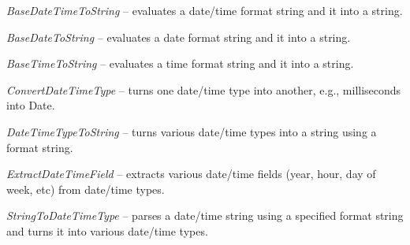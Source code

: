 \begin{tight_itemize}
	\item \textit{BaseDateTimeToString} -- evaluates a date/time format string 
	and it into a string.
	\item \textit{BaseDateToString} -- evaluates a date format string 
	and it into a string.
	\item \textit{BaseTimeToString} -- evaluates a time format string 
	and it into a string.
	\item \textit{ConvertDateTimeType} -- turns one date/time type into another,
	e.g., milliseconds into Date.
	\item \textit{DateTimeTypeToString} -- turns various date/time types into a 
	string using a format string.
	\item \textit{ExtractDateTimeField} -- extracts various date/time fields 
	(year, hour, day of week, etc) from date/time types.
	\item \textit{StringToDateTimeType} -- parses a date/time string using a 
	specified format string and turns it into various date/time types.
\end{tight_itemize}

\newpage
